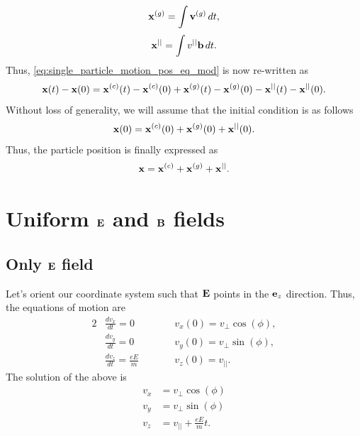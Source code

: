 \documentclass[a4paper,11pt]{report}
\begin{document}
\begin{equation}
    \mathbf{x}^{(g)} = \int \mathbf{v}^{(g)} \, dt,
\end{equation}
\begin{equation}
    \mathbf{x}^{||} = \int v^{||} \mathbf{b} \, dt.
\end{equation}
Thus, \cref{eq:single_particle_motion_pos_eq_mod} is now re-written as
\begin{equation}
    \mathbf{x}(t) - \mathbf{x}(0) = \mathbf{x}^{(c)}(t) - \mathbf{x}^{(c)}(0) + \mathbf{x}^{(g)}(t) - \mathbf{x}^{(g)}(0) - \mathbf{x}^{||}(t) - \mathbf{x}^{||}(0).
\end{equation}
Without loss of generality, we will assume that the initial condition is as follows
\begin{equation}
    \mathbf{x}(0) = \mathbf{x}^{(c)}(0) + \mathbf{x}^{(g)}(0) + \mathbf{x}^{||}(0).
\end{equation}
Thus, the particle position is finally expressed as
\begin{equation}
    \label{eq:single_particle_motion_pos_general}
    \mathbf{x} = \mathbf{x}^{(c)} + \mathbf{x}^{(g)} + \mathbf{x}^{||}.
\end{equation}


 
\section{Uniform $\mathbf{E}$ and $\mathbf{B}$ fields}

\subsection{Only $\mathbf{E}$ field}
Let's orient our coordinate system such that $\mathbf{E}$ points in the $\mathbf{e}_z$ direction. Thus, the equations of motion are
\begin{alignat}{2}
    &\frac{d v_x}{dt} = 0  \qquad && v_x(0) = v_\perp \cos(\phi), \nonumber \\
    &\frac{d v_y}{dt} = 0  \qquad && v_y(0) = v_\perp \sin(\phi), \nonumber \\
    &\frac{d v_z}{dt} = \frac{e E}{m}  \qquad && v_z(0) = v_{||}.
\end{alignat}
The solution of the above is
\begin{align}
    v_x &= v_\perp \cos(\phi) \nonumber \\
    v_y &= v_\perp \sin(\phi) \nonumber \\
    v_z &= v_{||} + \frac{e E}{m} t.
\end{align}
\end{document}
